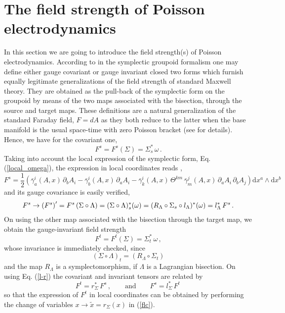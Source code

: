 \documentclass[12pt,a4paper]{article}
\numberwithin{equation}{section}
\theoremstyle{definition}
\newcommand{\dd}{\mathrm{d}}
\newcommand{\be}{\begin{equation}}
\newcommand{\ee}{\end{equation}}
\begin{document}
\section{The field strength of Poisson electrodynamics%
{}}\label{sec3}
In this section we are going to introduce the field strength(s) of Poisson electrodynamics. According to \cite{Kupriyanov:2023qot} in the symplectic groupoid formalism one may define either gauge covariant or gauge invariant closed two forms which furnish equally legitimate generalizations of  the field strength of standard Maxwell theory. They are obtained as the pull-back of the symplectic form on the groupoid by means of the two maps associated with the bisection, through the source and target maps. These definitions are a natural generalization of the standard Faraday field, $F=dA$ as they both reduce to the latter when the base manifold is the usual space-time with zero Poisson bracket (see \cite{Kupriyanov:2023qot, DiCosmo:2023wth} for details).  Hence, we have for the covariant one,
\begin{equation}\label{Fs}
F^s=F^s(\Sigma)=\Sigma^\ast_s\,\omega\,.
\end{equation}
Taking into account the local expression of the symplectic form, Eq. (\ref{local_omega}), the expression in local coordinates reads \cite{Kupriyanov:2023qot,DiCosmo:2023wth},
\begin{equation}\label{flc}
F^s=\frac12\left(\bar\gamma_a^i(A,x)\,\partial_b A_i-\bar\gamma_b^i(A,x)\,\partial_a A_i-\bar\gamma_k^i(A,x)\,\Theta^{km}\,\bar\gamma_m^j(A,x)\,\partial_aA_i\,\partial_bA_j  \right)\dd x^a\wedge \dd x^b\,
\end{equation}
and its  gauge covariance is easily verified,
\begin{eqnarray}
F^s\to\left(F^s\right)^\prime=F^s\left(\Sigma\circ\Lambda\right)= (\Sigma \circ \Lambda)_s^*(\omega) = (R_{\Lambda}\circ\Sigma_s\circ l_{\Lambda})^*(\omega) = l_\Lambda^\ast\,F^s\,.\notag
\end{eqnarray}
On using the other map associated with the bisection through the target map, we obtain the gauge-invariant field strength
\begin{equation}\label{Ft}
F^t=F^t(\Sigma)=\Sigma^\ast_t\,\omega\,,
\end{equation}
whose invariance is immediately checked, since 
\be
(\Sigma\circ\Lambda)_t = (R_{\Lambda}\circ \Sigma_t)
\ee
and the map $R_{\Lambda}$ is a symplectomorphism, if $\Lambda$ is a Lagrangian bisection. 
On using Eq.  (\ref{l-r}) the covariant and invariant tensors are related by
\begin{equation}
F^t=r_\Sigma^\ast\,F^s\,,\qquad \mbox{and}\qquad   F^s=l_\Sigma^\ast\,F^t\,
\end{equation}
so that the expression of $F^t$ in local coordinates can be obtained by performing the change of variables $x\to \tilde x=r_\Sigma(x)$ in (\ref{flc}). 
\end{document}
